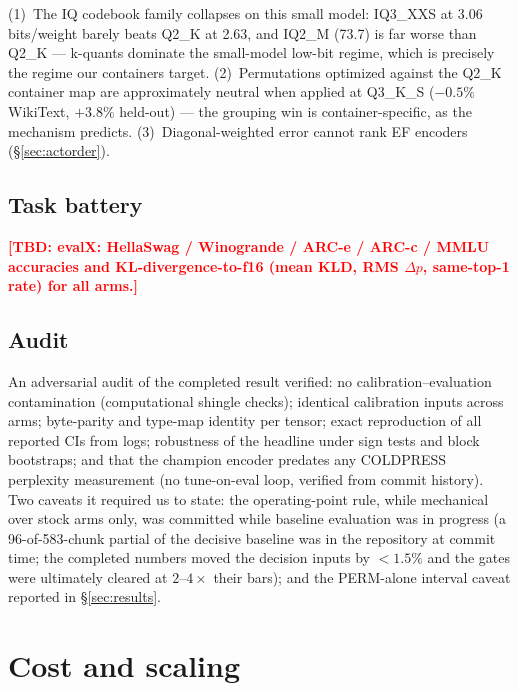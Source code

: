 \documentclass[11pt]{article}
\newcommand{\TBD}[1]{\textcolor{red}{\textbf{[TBD: #1]}}}
\begin{document}
(1)~The IQ codebook family collapses on this small model: IQ3\_XXS at 3.06 bits/weight
barely beats Q2\_K at 2.63, and IQ2\_M (73.7) is far worse than Q2\_K --- k-quants
dominate the small-model low-bit regime, which is precisely the regime our containers
target. (2)~Permutations optimized against the Q2\_K container map are approximately
neutral when applied at Q3\_K\_S ($-0.5\%$ WikiText, $+3.8\%$ held-out) --- the
grouping win is container-specific, as the mechanism predicts. (3)~Diagonal-weighted
error cannot rank EF encoders (\S\ref{sec:actorder}).

\subsection{Task battery}
\label{sec:battery}
\TBD{evalX: HellaSwag / Winogrande / ARC-e / ARC-c / MMLU accuracies and
KL-divergence-to-f16 (mean KLD, RMS $\Delta p$, same-top-1 rate) for all arms.}

\subsection{Audit}
\label{sec:audit}

An adversarial audit of the completed result verified: no calibration--evaluation
contamination (computational shingle checks); identical calibration inputs across
arms; byte-parity and type-map identity per tensor; exact reproduction of all reported
CIs from logs; robustness of the headline under sign tests and block bootstraps; and
that the champion encoder predates any COLDPRESS perplexity measurement (no
tune-on-eval loop, verified from commit history). Two caveats it required us to state:
the operating-point rule, while mechanical over stock arms only, was committed while
baseline evaluation was in progress (a 96-of-583-chunk partial of the decisive
baseline was in the repository at commit time; the completed numbers moved the
decision inputs by $<1.5\%$ and the gates were ultimately cleared at $2$--$4\times$
their bars); and the PERM-alone interval caveat reported in \S\ref{sec:results}.

\section{Cost and scaling}
\end{document}
